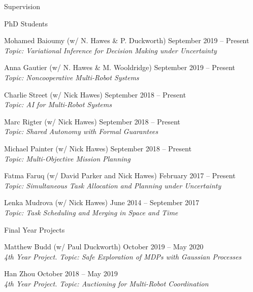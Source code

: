
\begin{rSection}{Supervision}

\begin{rSubsection}{PhD Students}{}{}{}
\item Mohamed Baioumy  (w/ N. Hawes \& P. Duckworth) \hfill September 2019 -- Present\\
\textit{Topic: Variational Inference for Decision Making under Uncertainty}

\item Anna Gautier (w/ N. Hawes \& M. Wooldridge) \hfill September 2019 -- Present\\
\textit{Topic: Noncooperative Multi-Robot Systems}

\item  Charlie Street (w/ Nick Hawes) \hfill September 2018 -- Present\\
\textit{Topic: AI for Multi-Robot Systems}

\item  Marc Rigter (w/ Nick Hawes) \hfill September 2018 -- Present\\
\textit{Topic: Shared Autonomy with Formal Guarantees}

\item  Michael Painter  (w/ Nick Hawes) \hfill September 2018 -- Present\\
\textit{Topic: Multi-Objective Mission Planning}

\item  Fatma Faruq  (w/ David Parker and Nick Hawes) \hfill February 2017 -- Present\\
\textit{Topic: Simultaneous Task Allocation and Planning under Uncertainty}

\item  Lenka Mudrova (w/ Nick Hawes) \hfill June 2014 -- September 2017\\
\textit{Topic: Task Scheduling and Merging in Space and Time}

\end{rSubsection}

\begin{rSubsection}{Final Year Projects}{}{}{}

\item Matthew Budd  (w/ Paul Duckworth)  \hfill October 2019 -- May 2020\\
\textit{4th Year Project. Topic: Safe Exploration of MDPs with Gaussian Processes}

\item Han Zhou \hfill October 2018 -- May 2019\\
\textit{4th Year Project. Topic: Auctioning for Multi-Robot Coordination}


\end{rSubsection}
\end{rSection}
